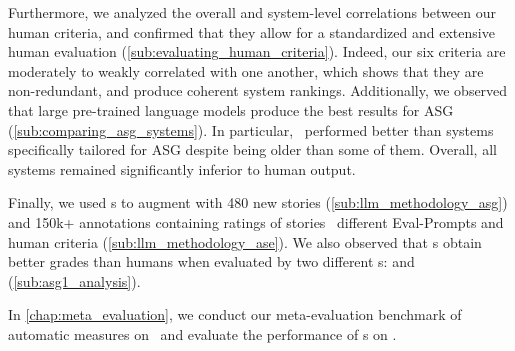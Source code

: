 Furthermore, we analyzed the overall and system-level correlations between our human criteria, and confirmed that they allow for a standardized and extensive human evaluation (\autoref{sub:evaluating_human_criteria}). Indeed, our six criteria are moderately to weakly correlated with one another, which shows that they are non-redundant, and produce coherent system rankings. Additionally, we observed that large pre-trained language models produce the best results for ASG (\autoref{sub:comparing_asg_systems}). In particular, \gptt\ performed better than systems specifically tailored for ASG despite being older than some of them. Overall, all systems remained significantly inferior to human output.

Finally, we used {\llmfull}s to augment {\hanna} with 480 new stories (\autoref{sub:llm_methodology_asg}) and 150k+ annotations containing ratings of stories {\wrt}\ different Eval-Prompts and human criteria (\autoref{sub:llm_methodology_ase}). We also observed that {\llm}s obtain better grades than humans when evaluated by two different {\llm}s: {\beluga} and {\mistral} (\autoref{sub:asg1_analysis}).

In \autoref{chap:meta_evaluation}, we conduct our meta-evaluation benchmark of automatic measures on \hanna\, and evaluate the performance of {\llmfull}s on {\asefull}.